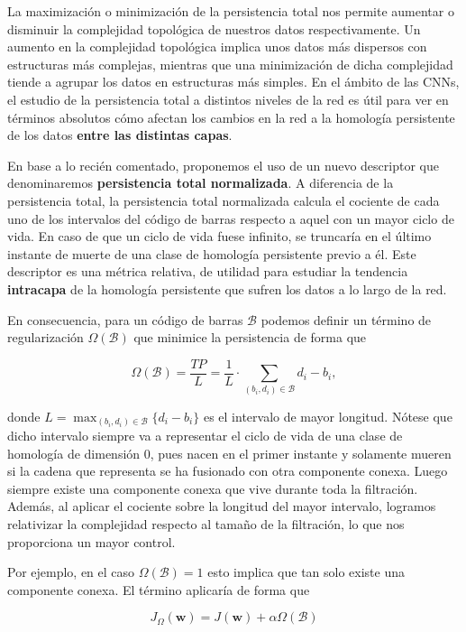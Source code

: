 La maximización o minimización de la persistencia total nos permite aumentar o disminuir
la complejidad topológica de nuestros datos respectivamente. Un aumento en la
complejidad topológica implica unos datos más dispersos con estructuras más
complejas, mientras que una minimización de dicha complejidad tiende a agrupar los
datos en estructuras más simples. En el ámbito de las CNNs, el estudio de la persistencia
total a distintos niveles de la red es útil para ver en términos absolutos cómo afectan
los cambios en la red a la homología persistente de los datos \textbf{entre las
	distintas capas}.

En base a lo recién comentado, proponemos el uso de un nuevo descriptor que denominaremos
\textbf{persistencia total normalizada}. A diferencia de la persistencia total,
la persistencia total normalizada calcula el cociente de cada uno de los
intervalos del código de barras respecto a aquel con un mayor ciclo de vida. En caso
de que un ciclo de vida fuese infinito, se truncaría en el último instante de
muerte de una clase de homología persistente previo a él. Este descriptor es una
métrica relativa, de utilidad para estudiar la tendencia \textbf{intracapa} de la
homología persistente que sufren los datos a lo largo de la red.

En consecuencia, para un código de barras $\mathcal{B}$ podemos definir un
término de regularización $\Omega(\mathcal{B})$ que minimice la persistencia de
forma que

\[
\Omega(\mathcal{B}) = \frac{TP}{L}= \frac{1}{L}\cdot \sum_{(b_i,d_i) \in
	\mathcal{B}}d_{i} - b_{i},
\]

donde $L = \max_{(b_i,d_i) \in \mathcal{B}}\{ d_{i} - b_{i} \}$ es el intervalo
de mayor longitud. Nótese que dicho intervalo siempre va a representar el ciclo de
vida de una clase de homología de dimensión 0, pues nacen en el primer instante
y solamente mueren si la cadena que representa se ha fusionado con otra
componente conexa. Luego siempre existe una componente conexa que vive durante toda
la filtración. Además, al aplicar el cociente sobre la longitud del mayor intervalo,
logramos relativizar la complejidad respecto al tamaño de la filtración, lo que nos
proporciona un mayor control.

Por ejemplo, en el caso $\Omega(\mathcal{B}) = 1$ esto implica que tan solo
existe una componente conexa. El término aplicaría de forma que

\[
J_{\Omega}(\mathbf{w}) = J(\mathbf{w}) + \alpha \Omega(\mathcal{B})
\]

